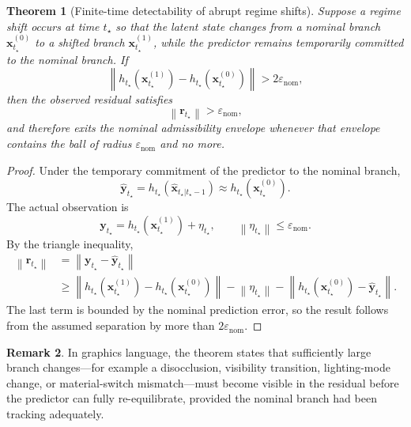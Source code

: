 \documentclass[11pt,letterpaper]{article}
\newcommand{\state}{\mathbf{x}}
\newcommand{\obs}{\mathbf{y}}
\newcommand{\pred}{\hat{\mathbf{y}}}
\newcommand{\resid}{\mathbf{r}}
\newcommand{\norm}[1]{\left\lVert #1 \right\rVert}
\theoremstyle{gcresult}
\newtheorem{theorem}{Theorem}[section]
\theoremstyle{definition}
\newtheorem{remark}[theorem]{Remark}
\begin{document}
\begin{theorem}[Finite-time detectability of abrupt regime shifts]
Suppose a regime shift occurs at time $t_\star$ so that the latent state changes from a nominal branch $\state^{(0)}_{t_\star}$ to a shifted branch $\state^{(1)}_{t_\star}$, while the predictor remains temporarily committed to the nominal branch. If
\begin{equation}
    \norm{h_{t_\star}(\state^{(1)}_{t_\star}) - h_{t_\star}(\state^{(0)}_{t_\star})} > 2\varepsilon_{\mathrm{nom}},
\end{equation}
then the observed residual satisfies
\begin{equation}
    \norm{\resid_{t_\star}} > \varepsilon_{\mathrm{nom}},
\end{equation}
and therefore exits the nominal admissibility envelope whenever that envelope contains the ball of radius $\varepsilon_{\mathrm{nom}}$ and no more.
\end{theorem}

\begin{proof}
Under the temporary commitment of the predictor to the nominal branch,
\begin{equation}
    \pred_{t_\star} = h_{t_\star}(\hat{\state}_{t_\star|t_\star-1}) \approx h_{t_\star}(\state^{(0)}_{t_\star}).
\end{equation}
The actual observation is
\begin{equation}
    \obs_{t_\star} = h_{t_\star}(\state^{(1)}_{t_\star}) + \eta_{t_\star},
    \qquad \norm{\eta_{t_\star}} \le \varepsilon_{\mathrm{nom}}.
\end{equation}
By the triangle inequality,
\begin{align}
    \norm{\resid_{t_\star}}
    &= \norm{\obs_{t_\star} - \pred_{t_\star}} \\
    &\ge \norm{h_{t_\star}(\state^{(1)}_{t_\star}) - h_{t_\star}(\state^{(0)}_{t_\star})}
       - \norm{\eta_{t_\star}}
       - \norm{h_{t_\star}(\state^{(0)}_{t_\star}) - \pred_{t_\star}}.
\end{align}
The last term is bounded by the nominal prediction error, so the result follows from the assumed separation by more than $2\varepsilon_{\mathrm{nom}}$.
\end{proof}

\begin{remark}
In graphics language, the theorem states that sufficiently large branch changes---for example a disocclusion, visibility transition, lighting-mode change, or material-switch mismatch---must become visible in the residual before the predictor can fully re-equilibrate, provided the nominal branch had been tracking adequately.
\end{remark}
\end{document}
